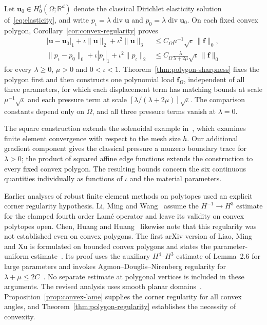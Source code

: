 \documentclass[10pt]{amsart}
\renewcommand{\div}{\operatorname{div}}
\numberwithin{equation}{section}
\begin{document}
Let $\boldsymbol u_0\in H_0^1(\Omega;\mathbb R^d)$ denote the classical Dirichlet elasticity solution of~\eqref{eq:elasticity}, and write $p_\iota=\lambda\div\boldsymbol u$ and $p_0=\lambda\div\boldsymbol u_0$. On each fixed convex polygon, Corollary~\ref{cor:convex-regularity} proves
\begin{equation}\label{intro:straingradregularity}
\begin{aligned}
|\boldsymbol u-\boldsymbol u_0|_1+\iota\|\boldsymbol u\|_2+\iota^2\|\boldsymbol u\|_3
&\leq C_\Omega\mu^{-1}\sqrt\iota\,\|\boldsymbol f\|_0,\\
\|p_\iota-p_0\|_0+\iota|p_\iota|_1+\iota^2\|p_\iota\|_2
&\leq C_\Omega\frac{\lambda}{\lambda+2\mu}\sqrt\iota\,\|\boldsymbol f\|_0
\end{aligned}
\end{equation}
for every $\lambda\geq0$, $\mu>0$ and $0<\iota<1$. Theorem~\ref{thm:polygon-sharpness} fixes the polygon first and then constructs one polynomial load $\boldsymbol f_\Omega$, independent of all three parameters, for which each displacement term has matching bounds at scale $\mu^{-1}\sqrt\iota$ and each pressure term at scale $[\lambda/(\lambda+2\mu)]\sqrt\iota$. The comparison constants depend only on $\Omega$, and all three pressure terms vanish at $\lambda=0$.

The square construction extends the solenoidal example in~\cite[Example~6.2]{ChenHuangHuang2023}, which examines finite element convergence with respect to the mesh size $h$. Our additional gradient component gives the classical pressure a nonzero boundary trace for $\lambda>0$; the product of squared affine edge functions extends the construction to every fixed convex polygon. The resulting bounds concern the six continuous quantities individually as functions of $\iota$ and the material parameters.

Earlier analyses of robust finite element methods on polytopes used an explicit corner regularity hypothesis. Li, Ming and Wang~\cite[Hypothesis~1, equation~(14), p.~6]{LiMingWang2021Korn} assume the $H^{-1}\to H^3$ estimate for the clamped fourth order Lam\'e operator and leave its validity on convex polytopes open. Chen, Huang and Huang~\cite[Remark~3.2, p.~2242]{ChenHuangHuang2023} likewise note that this regularity was not established even on convex polygons. The first arXiv version of Liao, Ming and Xu is formulated on bounded convex polygons and states the parameter-uniform estimate~\cite[Section~2, p.~2, and Lemma~2.7, equation~(2.18), p.~7]{LiaoMingXu2021taylorhood}. Its proof uses the auxiliary $H^4$--$H^3$ estimate of Lemma~2.6 for large parameters and invokes Agmon--Douglis--Nirenberg regularity for $\lambda+\mu\leq2C$~\cite[Lemmas~2.6--2.7 and their proofs, pp.~6--7]{LiaoMingXu2021taylorhood}. No separate estimate at polygonal vertices is included in these arguments. The revised analysis uses smooth planar domains~\cite[Lemma~2.6]{LiaoMingXu2023}. Proposition~\ref{prop:convex-lame} supplies the corner regularity for all convex angles, and Theorem~\ref{thm:polygon-regularity} establishes the necessity of convexity.
\end{document}
